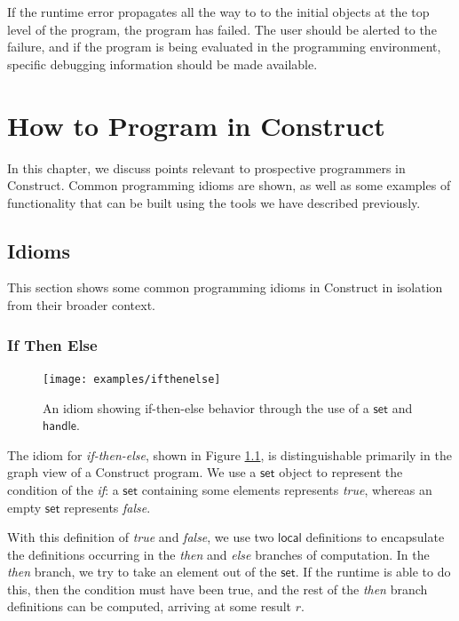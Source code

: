 \documentclass[twoside,openright,11pt]{report}
\begin{document}
If the runtime error propagates all the way to to the initial objects at the top level of the program, the program has failed. 
The user should be alerted to the failure, and if the program is being evaluated in the programming environment, specific debugging information should be made available.

\chapter{How to Program in Construct}
\label{chap:howto}

In this chapter, we discuss points relevant to prospective programmers in Construct. Common programming idioms are shown, as well as some examples of functionality that can be built using the tools we have described previously.

\section{Idioms}
\label{sec:idioms}

This section shows some common programming idioms in Construct in isolation from their broader context.

\subsection{If Then Else}
\label{subsec:if}

\begin{figure}[h]
  \centering
  \texttt{[image: examples/ifthenelse]}
  \caption{An idiom showing if-then-else behavior through the use of a $\mathsf{set}$ and $\mathsf{handle}$.}
  \label{fig:ifthenelse}
\end{figure}

The idiom for {\it if-then-else}, shown in Figure \ref{fig:ifthenelse}, is distinguishable primarily in the graph view of a Construct program.
We use a $\mathsf{set}$ object to represent the condition of the {\it if}: a $\mathsf{set}$ containing some elements represents {\it true}, whereas an empty $\mathsf{set}$ represents {\it false}.

With this definition of {\it true} and {\it false}, we use two $\mathsf{local}$ definitions to encapsulate the definitions occurring in the {\it then} and {\it else} branches of computation. 
In the {\it then} branch, we try to take an element out of the $\mathsf{set}$. 
If the runtime is able to do this, then the condition must have been true, and the rest of the {\it then} branch definitions can be computed, arriving at some result $r$.
\end{document}
